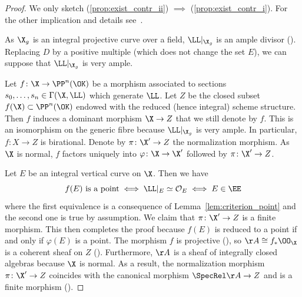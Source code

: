 \begin{proof}
    We only sketch (\ref{prop:exist_contr_ii}) $\implies$ (\ref{prop:exist_contr_i}).
    For the other implication and details see~\cite[Proposition 8.3.30]{Liu}.

    As $\X_g$ is an integral projective curve over a field, $\LL|_{\X_g}$
    is an ample divisor (\cite[Proposition 7.5.5]{Liu}). Replacing $D$ by a positive multiple (which
    does not change the set $E$), we can suppose that $\LL|_{\X_g}$ is very ample.

    Let $f \colon \X \to \PP^n(\OK )$ be a morphism associated to sections $s_0, \ldots, s_n \in \Gamma(\X, \LL)$ which generate $\LL$.
    Let $Z$ be the closed subset $f(\X) \subset \PP^n(\OK )$
    endowed with the reduced (hence integral) scheme structure.
    Then $f$ induces a dominant morphism $\X \to Z$ that we still denote by $f$.
    This is an isomorphism on the generic fibre because $\LL|_{\X_g}$ is very ample.
    In particular, $f \colon X \to Z$ is birational.
    Denote by $\pi \colon \X' \to Z$ the normalization morphism.
    As $\X$ is normal, $f$ factors uniquely into $\varphi \colon \X \to \X'$ followed by $\pi \colon \X' \to Z$.
    \begin{center}
    \end{center}
    Let $E$ be an integral vertical curve on $\X$. Then we have
    \[
        f(E) \textrm{ is a point} \iff \LL|_E \simeq \mathcal{O}_E \iff E \in \EE
    \]
    where the first equivalence is a consequence of Lemma~\ref{lem:criterion_point} and the second one is true by assumption.
    We claim that $\pi \colon \X' \to Z$ is a finite morphism.
    This then completes the proof because $f(E)$ is reduced to a point if and only if $\varphi(E)$ is a point.
    The morphism $f$ is projective (\cite[Corollary 3.3.32(e)]{Liu}), so $\AA \cong f_*\OO_\X$ is a coherent
    sheaf on $Z$ (\cite[Corollary 5.3.5]{Liu}). Furthermore, $\AA$ is a sheaf of integrally closed algebras because $\X$ is normal.
    As a result, the normalization morphism $\pi \colon \X' \to Z$
    coincides with the canonical morphism $\SpecRel \AA \to Z$ and is a finite morphism (\cite[Exercise 5.1.17]{Liu}).
\end{proof}

